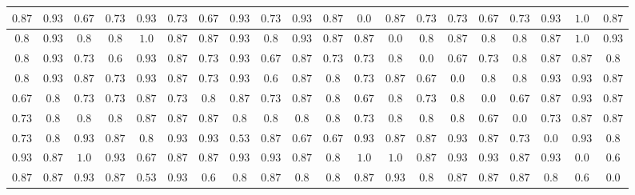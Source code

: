 \begin{table}[h!]
{\begin{tabular}{cccccccccccccccccccc}
$0.87$ & $0.93$ & $0.67$ & $0.73$ & $0.93$ & $0.73$ & $0.67$ & $0.93$ & $0.73$ & $0.93$ & $0.87$ & $0.0$ & $0.87$ & $0.73$ & $0.73$ & $0.67$ & $0.73$ & $0.93$ & $1.0$ & $0.87$\\ \hline
$0.8$ & $0.93$ & $0.8$ & $0.8$ & $1.0$ & $0.87$ & $0.87$ & $0.93$ & $0.8$ & $0.93$ & $0.87$ & $0.87$ & $0.0$ & $0.8$ & $0.87$ & $0.8$ & $0.8$ & $0.87$ & $1.0$ & $0.93$\\ \hline
$0.8$ & $0.93$ & $0.73$ & $0.6$ & $0.93$ & $0.87$ & $0.73$ & $0.93$ & $0.67$ & $0.87$ & $0.73$ & $0.73$ & $0.8$ & $0.0$ & $0.67$ & $0.73$ & $0.8$ & $0.87$ & $0.87$ & $0.8$\\ \hline
$0.8$ & $0.93$ & $0.87$ & $0.73$ & $0.93$ & $0.87$ & $0.73$ & $0.93$ & $0.6$ & $0.87$ & $0.8$ & $0.73$ & $0.87$ & $0.67$ & $0.0$ & $0.8$ & $0.8$ & $0.93$ & $0.93$ & $0.87$\\ \hline
$0.67$ & $0.8$ & $0.73$ & $0.73$ & $0.87$ & $0.73$ & $0.8$ & $0.87$ & $0.73$ & $0.87$ & $0.8$ & $0.67$ & $0.8$ & $0.73$ & $0.8$ & $0.0$ & $0.67$ & $0.87$ & $0.93$ & $0.87$\\ \hline
$0.73$ & $0.8$ & $0.8$ & $0.8$ & $0.87$ & $0.87$ & $0.87$ & $0.8$ & $0.8$ & $0.8$ & $0.8$ & $0.73$ & $0.8$ & $0.8$ & $0.8$ & $0.67$ & $0.0$ & $0.73$ & $0.87$ & $0.87$\\ \hline
$0.73$ & $0.8$ & $0.93$ & $0.87$ & $0.8$ & $0.93$ & $0.93$ & $0.53$ & $0.87$ & $0.67$ & $0.67$ & $0.93$ & $0.87$ & $0.87$ & $0.93$ & $0.87$ & $0.73$ & $0.0$ & $0.93$ & $0.8$\\ \hline
$0.93$ & $0.87$ & $1.0$ & $0.93$ & $0.67$ & $0.87$ & $0.87$ & $0.93$ & $0.93$ & $0.87$ & $0.8$ & $1.0$ & $1.0$ & $0.87$ & $0.93$ & $0.93$ & $0.87$ & $0.93$ & $0.0$ & $0.6$\\ \hline
$0.87$ & $0.87$ & $0.93$ & $0.87$ & $0.53$ & $0.93$ & $0.6$ & $0.8$ & $0.87$ & $0.8$ & $0.8$ & $0.87$ & $0.93$ & $0.8$ & $0.87$ & $0.87$ & $0.87$ & $0.8$ & $0.6$ & $0.0$
        \end{tabular}}
\end{table}


